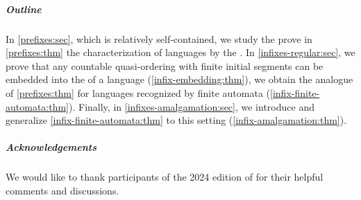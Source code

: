 \subparagraph{Outline} In \cref{prefixes:sec}, which is relatively
self-contained, we study the  prove in \cref{prefixes:thm}
the characterization of  languages by the . In \cref{infixes-regular:sec}, we prove that any countable quasi-ordering
with finite initial segments can be embedded into the  of a
language (\cref{infix-embedding:thm}), we obtain the analogue of
\cref{prefixes:thm} for languages recognized by finite automata
(\cref{infix-finite-automata:thm}). Finally, in \cref{infixes-amalgamation:sec}, we
introduce  and generalize
\cref{infix-finite-automata:thm} to this setting
(\cref{infix-amalgamation:thm}).

\subparagraph{Acknowledgements} We would like to thank participants of the 2024
edition of  for their helpful comments and discussions.
